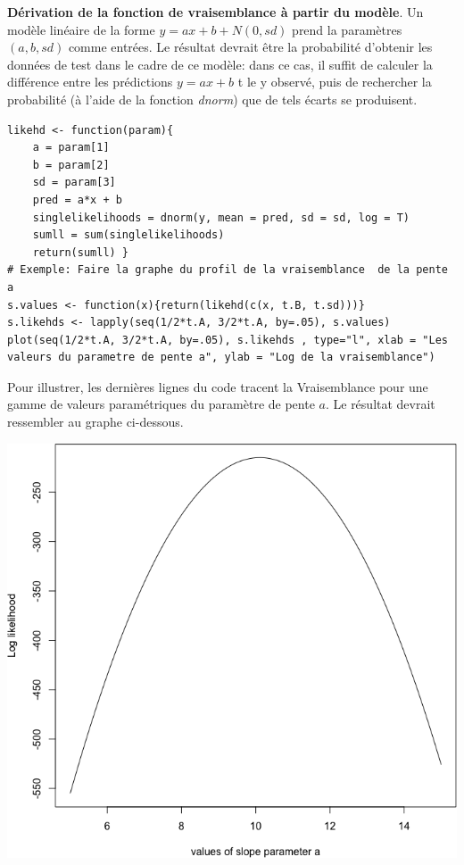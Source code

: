 \begin{Exemple}
\textbf{D\'erivation de la fonction de vraisemblance \`a partir du mod\`ele}. Un mod\`ele lin\'eaire de la forme $y = ax + b + N(0,sd)$ prend la param\`etres $(a, b, sd)$ comme entr\'ees. Le r\'esultat devrait être la probabilit\'e d'obtenir les donn\'ees de test dans le cadre de ce mod\`ele: dans ce cas, il suffit de calculer la diff\'erence entre les pr\'edictions $y = ax + b$ t le y observ\'e, puis de rechercher la probabilit\'e (\`a l'aide de la fonction \textit{dnorm}) que de tels \'ecarts se produisent.
\begin{lstlisting}
likehd <- function(param){
    a = param[1]
    b = param[2]
    sd = param[3]
    pred = a*x + b
    singlelikelihoods = dnorm(y, mean = pred, sd = sd, log = T)
    sumll = sum(singlelikelihoods)
    return(sumll) }
# Exemple: Faire la graphe du profil de la vraisemblance  de la pente a
s.values <- function(x){return(likehd(c(x, t.B, t.sd)))}
s.likehds <- lapply(seq(1/2*t.A, 3/2*t.A, by=.05), s.values)
plot(seq(1/2*t.A, 3/2*t.A, by=.05), s.likehds , type="l", xlab = "Les valeurs du parametre de pente a", ylab = "Log de la vraisemblance")
\end{lstlisting}
Pour illustrer, les derni\`eres lignes du code tracent la Vraisemblance pour une gamme de valeurs param\'etriques du param\`etre de pente $a$. Le r\'esultat devrait ressembler au graphe ci-dessous. 
\begin{center}
		\includegraphics[width=0.95\linewidth]{Images/example9b.png}
\end{center}

\end{Exemple}
